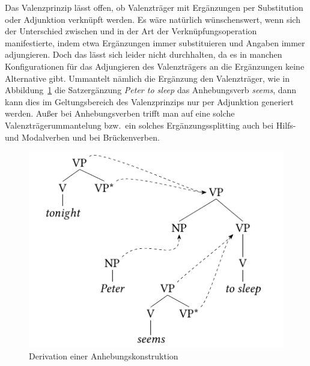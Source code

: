 Das Valenzprinzip lässt offen, ob Valenzträger mit Ergänzungen per Substitution oder Adjunktion verknüpft werden. Es wäre natürlich wünschenswert, wenn sich der Unterschied zwischen  und  in der Art der Verknüpfungsoperation manifestierte, indem etwa Ergänzungen immer substituieren und Angaben immer adjungieren. Doch das lässt sich leider nicht durchhalten, da es in manchen Konfigurationen für das Adjungieren des Valenzträgers an die Ergänzungen keine Alternative gibt. Ummantelt nämlich die Ergänzung den Valenzträger, wie in Abbildung~\ref{fig-TAG-raising} die Satzergänzung {\it Peter to sleep} das Anhebungsverb {\it seems}, dann kann dies im Geltungsbereich des Valenzprinzips nur per Adjunktion generiert werden. Au\ss er bei Anhebungsverben trifft man auf eine solche Valenzträgerummantelung bzw.\ ein solches Ergänzungssplitting auch bei Hilfs- und Modalverben und bei Brückenverben.

\begin{figure}[t]
\centering
\includegraphics{graphics/abb511.pdf}
\caption{\label{fig-TAG-raising}Derivation einer Anhebungskonstruktion}
\end{figure}

